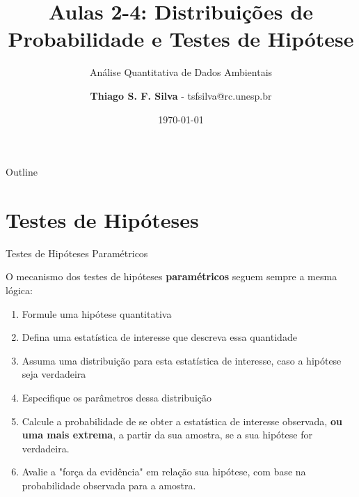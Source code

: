 \documentclass{beamer}
\title{Aulas 2-4: Distribuições de Probabilidade e Testes de Hipótese}
\subtitle{Análise Quantitativa de Dados Ambientais}
\author{\textbf{Thiago S. F. Silva} - tsfsilva@rc.unesp.br}
\institute{Programa de Pós Graduação em Geografia - IGCE/UNESP}
\date{\today}
\begin{document}



\begin{frame}[plain] %
  \titlepage
\end{frame}

\begin{frame}{Outline}
  \tableofcontents
\end{frame}




\section{Testes de Hipóteses}


\begin{frame}{Testes de Hipóteses Paramétricos}

O mecanismo dos testes de hipóteses \textbf{paramétricos} seguem sempre a mesma lógica:
\vfill
  \begin{small}
  \begin{enumerate}
    \item Formule uma hipótese quantitativa \pause
    \item Defina uma estatística de interesse que descreva essa quantidade \pause
    \item Assuma uma distribuição para esta estatística de interesse, caso a hipótese seja verdadeira
    \item Especifique os parâmetros dessa distribuição \pause
    \item Calcule a probabilidade de se obter a estatística de interesse observada, \textbf{ou uma mais extrema}, a partir da sua amostra, se a sua hipótese for verdadeira. \pause
    \item Avalie a "força da evidência" em relação sua hipótese, com base na probabilidade observada para a amostra. \pause
  \end{enumerate}
  \end{small}
  
\end{frame} 
\end{document}
